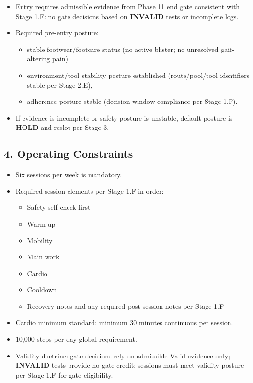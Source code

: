\documentclass[10pt]{article}
\begin{document}
\begin{itemize}
\item Entry requires admissible evidence from Phase 11 end gate consistent with Stage 1.F: no gate decisions based on \textbf{INVALID} tests or incomplete logs.
\item Required pre-entry posture:
  \begin{itemize}
  \item stable footwear/footcare status (no active blister; no unresolved gait-altering pain),
  \item environment/tool stability posture established (route/pool/tool identifiers stable per Stage 2.E),
  \item adherence posture stable (decision-window compliance per Stage 1.F).
  \end{itemize}
\item If evidence is incomplete or safety posture is unstable, default posture is \textbf{HOLD} and reslot per Stage 3.
\end{itemize}

\subsection*{4. Operating Constraints}


\begin{itemize}
\item Six sessions per week is mandatory.
\item Required session elements per Stage 1.F in order:
  \begin{itemize}
  \item Safety self-check first
  \item Warm-up
  \item Mobility
  \item Main work
  \item Cardio
  \item Cooldown
  \item Recovery notes and any required post-session notes per Stage 1.F
  \end{itemize}
\item Cardio minimum standard: minimum 30 minutes continuous per session.
\item 10,000 steps per day global requirement.
\item Validity doctrine: gate decisions rely on admissible Valid evidence only; \textbf{INVALID} tests provide no gate credit; sessions must meet validity posture per Stage 1.F for gate eligibility.
\end{itemize}
\end{document}
